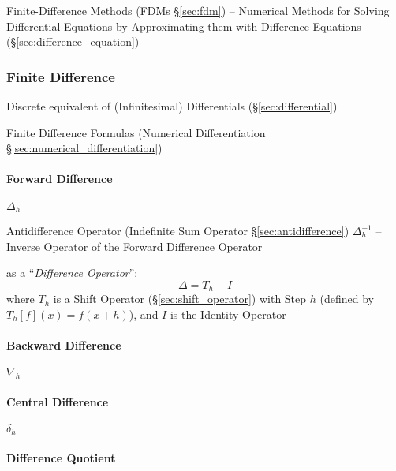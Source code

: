 \fist Finite-Difference Methods (FDMs \S\ref{sec:fdm}) -- Numerical Methods for
Solving Differential Equations by Approximating them with Difference Equations
(\S\ref{sec:difference_equation})



\subsubsection{Finite Difference}\label{sec:finite_difference}

Discrete equivalent of (Infinitesimal) Differentials (\S\ref{sec:differential})

Finite Difference Formulas (Numerical Differentiation
\S\ref{sec:numerical_differentiation})



\paragraph{Forward Difference}\label{sec:forward_difference}\hfill

$\Delta_h$

\fist Antidifference Operator (Indefinite Sum Operator
\S\ref{sec:antidifference}) $\Delta^{-1}_h$ -- Inverse Operator of the Forward
Difference Operator

as a ``\emph{Difference Operator}'':
\[
  \Delta = T_h - I
\]
where $T_h$ is a Shift Operator (\S\ref{sec:shift_operator}) with Step $h$
(defined by $T_h[f](x) = f(x + h)$), and $I$ is the Identity Operator



\paragraph{Backward Difference}\label{sec:backward_difference}\hfill

$\nabla_h$



\paragraph{Central Difference}\label{sec:central_difference}\hfill

$\delta_h$



\paragraph{Difference Quotient}\label{sec:difference_quotient}\hfill

